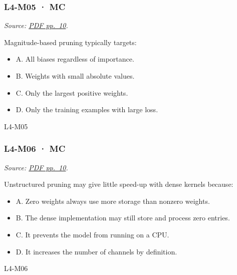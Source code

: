 \noindent\begin{minipage}{\linewidth}

\subsubsection{L4-M05 · MC}\label{l4-m05-mc}

\emph{Source:
\href{../Lab\%20Sessions/Lab4/manolo_presentation.pdf\#page=10}{PDF
pp.~10}.}

Magnitude-based pruning typically targets:

\begin{itemize}
\tightlist
\item
  A. All biases regardless of importance.
\item
  B. Weights with small absolute values.
\item
  C. Only the largest positive weights.
\item
  D. Only the training examples with large loss.
\end{itemize}

\begin{solution}[8mm]{L4-M05}

\end{solution}
\end{minipage}\par\medskip

\noindent\begin{minipage}{\linewidth}

\subsubsection{L4-M06 · MC}\label{l4-m06-mc}

\emph{Source:
\href{../Lab\%20Sessions/Lab4/manolo_presentation.pdf\#page=10}{PDF
pp.~10}.}

Unstructured pruning may give little speed-up with dense kernels
because:

\begin{itemize}
\tightlist
\item
  A. Zero weights always use more storage than nonzero weights.
\item
  B. The dense implementation may still store and process zero entries.
\item
  C. It prevents the model from running on a CPU.
\item
  D. It increases the number of channels by definition.
\end{itemize}

\begin{solution}[8mm]{L4-M06}

\end{solution}
\end{minipage}\par\medskip

